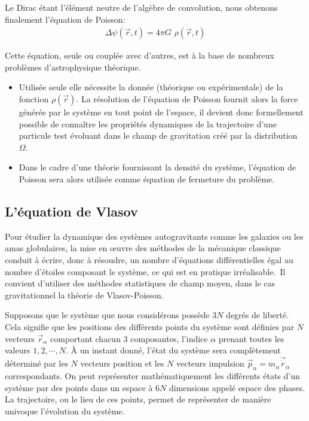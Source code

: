 Le Dirac étant l'élément neutre de l'algèbre de convolution, nous obtenons finalement l'équation de Poisson:
\begin{align*}
	\Delta\psi(\vec{r},t)=4\pi G\,\,\rho(\vec{r},t)
\end{align*}

Cette équation, seule ou couplée avec d'autres, est à la base de nombreux problèmes d'astrophysique théorique.

\begin{itemize}

	\item Utilisée seule elle nécessite la donnée (théorique ou expérimentale) de la fonction $\rho(\vec{r})$. La résolution de l'équation de
		Poisson fournit alors la force générée par le système en tout point de l'espace, il devient donc formellement possible de
		connaître les propriétés dynamiques de la trajectoire d'une particule test évoluant dans le champ de gravitation créé par la
		distribution $\Omega$.

	\item Dans le cadre d'une théorie fournissant la densité du système, l'équation de Poisson sera alors utilisée comme équation de fermeture
		du problème.

\end{itemize}

\subsection{L'équation de Vlasov}

Pour étudier la dynamique des systèmes autogravitants comme les galaxies ou les amas globulaires, la mise en œuvre des méthodes de la mécanique
classique conduit à écrire, donc à résoudre, un nombre d'équations différentielles égal au nombre d'étoiles composant le système, ce qui est en
pratique irréalisable.\ Il convient d'utiliser des méthodes statistiques de champ moyen, dans le cas gravitationnel la théorie de Vlasov-Poisson.

Supposons que le système que nous considérons possède $3N$ degrés de liberté. Cela signifie que les positions des différents points du système sont
définies par $N$ vecteurs $\vec{r}_{\alpha}$ comportant chacun 3 composantes, l'indice $\alpha$ prenant toutes les valeurs $1,2,\cdots,N$. À un
instant donné, l'état du système sera complètement déterminé par les $N$ vecteurs position et les $N$ vecteurs impulsion
$\vec{p}_{\alpha}=m_{\alpha}\vec{\dot{r}}_{\alpha}$ correspondants. On peut représenter mathématiquement les différents états d'un système par
des points dans un espace à $6N$ {dimension}s appelé espace des phases. La trajectoire, ou le lieu de ces points, permet de représenter de manière
univoque l'évolution du système.

